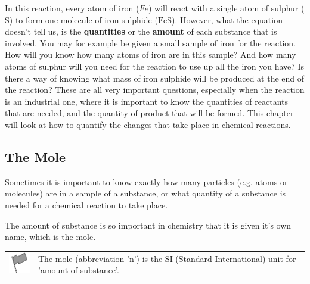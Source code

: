       \label{m38717*id275542}In this reaction, every atom of iron (\begin{math}Fe\end{math}) will react with a single atom of sulphur (\begin{math}\mathrm{S}\end{math}) to form one molecule of iron sulphide (\begin{math}\mathrm{FeS}\end{math}). However, what the equation doesn't tell us, is the \textbf{quantities} or the \textbf{amount} of each substance that is involved. You may for example be given a small sample of iron for the reaction. How will you know how many atoms of iron are in this sample? And how many atoms of sulphur will you need for the reaction to use up all the iron you have? Is there a way of knowing what mass of iron sulphide will be produced at the end of the reaction? These are all very important questions, especially when the reaction is an industrial one, where it is important to know the quantities of reactants that are needed, and the quantity of product that will be formed. This chapter will look at how to quantify the changes that take place in chemical reactions.\par 
    
    \label{m38717*cid2}
            \subsection{ The Mole}
            \nopagebreak
            
      
      \label{m38717*id275573}Sometimes it is important to know exactly how many particles (e.g. atoms or molecules) are in a sample of a substance, or what quantity of a substance is needed for a chemical reaction to take place.\par 
      
      
      
      
      
\label{m38717*eip-872}The amount of substance is so important in chemistry that it is given it's own name, which is the mole.  \par \label{m38717*fhsst!!!underscore!!!id119}\begin{definition}
	  \begin{tabular*}{15 cm}{m{15 mm}m{}}
	\hspace*{-50pt}  \includegraphics[width=0.5in]{col11305.imgs/psflag2.png}   & \Definition{   \label{id2496528}\textbf{ Mole }} { \label{m38717*meaningfhsst!!!underscore!!!id119}
      \label{m38717*id275969}The mole (abbreviation 'n') is the SI (Standard International) unit for 'amount of substance'. \par 
       } 
      \end{tabular*}
      \end{definition}

